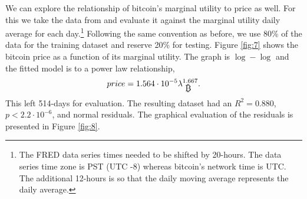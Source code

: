 \documentclass[runningheads]{llncs}
\def\bitcoin{
    \leavevmode
    \vtop{\offinterlineskip %
    \setbox0=\hbox{B}
    \setbox2=\hbox to\wd0{\hfil\hskip-.03em
    \vrule height .3ex width .15ex\hskip .08em
    \vrule height .3ex width .15ex\hfil}
    \vbox{\copy2\box0}\box2}
}
\begin{document}
We can explore the relationship of bitcoin's marginal utility to price as well.
For this we take the data from \cite{fred2022btcusd} and evaluate it against the marginal utility daily average for each day.\footnote{
    The FRED data series times needed to be shifted by 20-hours.
    The data series time zone is PST (UTC -8) whereas bitcoin's network time is UTC.
    The additional 12-hours is so that the daily moving average represents the daily average.
}
Following the same convention as before, we use 80\% of the data for the training dataset and reserve 20\% for testing.
Figure \ref{fig:7} shows the bitcoin price as a function of its marginal utility.
The graph is $\log - \log$ and the fitted model is to a power law relationship,
\begin{equation}
    price = 1.564 \cdot 10^{-5} \lambda_{\mbox{\bitcoin}}^{1.667}.\label{eq:16}
\end{equation}
This left 514-days for evaluation.
The resulting dataset had an $R^2=0.880$, $p<2.2\cdot10^{-6}$, and normal residuals.
The graphical evaluation of the residuals is presented in Figure \ref{fig:8}.
\end{document}
